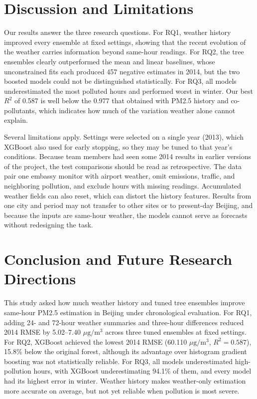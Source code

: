 \documentclass[11pt]{article}
\newcommand{\conc}{\ensuremath{\mu\mathrm{g}/\mathrm{m}^3}}
\begin{document}
\section{Discussion and Limitations}
Our results answer the three research questions. For RQ1, weather history improved every ensemble at fixed settings, showing that the recent evolution of the weather carries information beyond same-hour readings. For RQ2, the tree ensembles clearly outperformed the mean and linear baselines, whose unconstrained fits each produced 457 negative estimates in 2014, but the two boosted models could not be distinguished statistically. For RQ3, all models underestimated the most polluted hours and performed worst in winter. Our best $R^2$ of 0.587 is well below the 0.977 that \citet{wang2026} obtained with PM2.5 history and co-pollutants, which indicates how much of the variation weather alone cannot explain.

Several limitations apply. Settings were selected on a single year (2013), which XGBoost also used for early stopping, so they may be tuned to that year's conditions. Because team members had seen some 2014 results in earlier versions of the project, the test comparisons should be read as retrospective. The data pair one embassy monitor with airport weather, omit emissions, traffic, and neighboring pollution, and exclude hours with missing readings. Accumulated weather fields can also reset, which can distort the history features. Results from one city and period may not transfer to other sites or to present-day Beijing, and because the inputs are same-hour weather, the models cannot serve as forecasts without redesigning the task.


\section{Conclusion and Future Research Directions}
This study asked how much weather history and tuned tree ensembles improve same-hour PM2.5 estimation in Beijing under chronological evaluation. For RQ1, adding 24- and 72-hour weather summaries and three-hour differences reduced 2014 RMSE by 5.02--7.40 \conc{} across three tuned ensembles at fixed settings. For RQ2, XGBoost achieved the lowest 2014 RMSE (60.110 \conc{}, $R^2=0.587$), 15.8\% below the original forest, although its advantage over histogram gradient boosting was not statistically reliable. For RQ3, all models underestimated high-pollution hours, with XGBoost underestimating 94.1\% of them, and every model had its highest error in winter. Weather history makes weather-only estimation more accurate on average, but not yet reliable when pollution is most severe.
\end{document}
